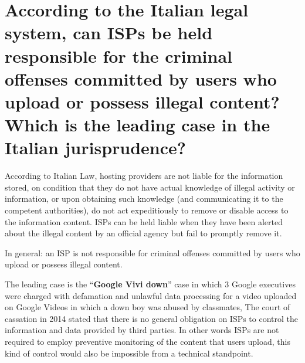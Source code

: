 \documentclass[a4paper, 11pt]{article}
\begin{document}
\section{According to the Italian legal system, can ISPs be held responsible for the criminal offenses committed by users who upload or possess illegal content? Which is the leading case in the Italian jurisprudence?}
According to Italian Law, hosting providers are not liable for the information stored, on condition that they do not have actual knowledge of illegal activity or information, or upon obtaining such knowledge (and communicating it to the competent authorities), do not act expeditiously to remove or disable access to the information content. ISPs can be held liable when they have been alerted about the illegal content by an official agency but fail to promptly remove it.

In general: an ISP is not responsible for criminal offenses committed by users who upload or possess illegal content.

The leading case is the ``\textbf{Google Vivi down}'' case in which 3 Google executives were charged with defamation and unlawful data processing for a video uploaded on Google Videos in which a down boy was abused by classmates, The court of cassation in 2014 stated that there is no general obligation on ISPs to control the information and data provided by third parties. In other words ISPs are not required to employ preventive monitoring of the content that users upload, this kind of control would also be impossible from a technical standpoint.
\end{document}
